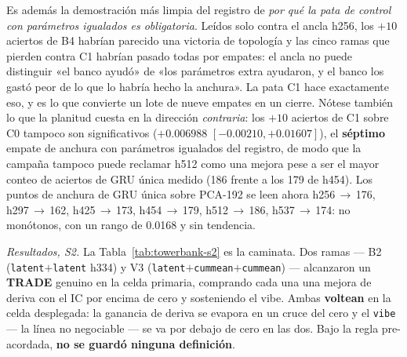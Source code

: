 \documentclass[11pt]{article}
\begin{document}
Es además la demostración más limpia del registro de \emph{por qué la pata de
control con parámetros igualados es obligatoria}. Leídos solo contra el ancla
h256, los $+\num{10}$ aciertos de B4 habrían parecido una victoria de topología y
las cinco ramas que pierden contra C1 habrían pasado todas por empates: el ancla
no puede distinguir «el banco ayudó» de «los parámetros extra ayudaron, y el banco
los gastó peor de lo que lo habría hecho la anchura». La pata C1 hace exactamente
eso, y es lo que convierte un lote de nueve empates en un cierre. Nótese también
lo que la planitud cuesta en la dirección \emph{contraria}: los $+\num{10}$
aciertos de C1 sobre C0 tampoco son significativos ($+\num{0.006988}$
$[-\num{0.00210},+\num{0.01607}]$), el \textbf{séptimo} empate de anchura con
parámetros igualados del registro, de modo que la campaña tampoco puede reclamar
h512 como una mejora pese a ser el mayor conteo de aciertos de GRU única medido
(\num{186} frente a los \num{179} de h454). Los puntos de anchura de GRU única
sobre PCA-192 se leen ahora h256\,$\to$\,\num{176}, h297\,$\to$\,\num{162},
h425\,$\to$\,\num{173}, h454\,$\to$\,\num{179}, h512\,$\to$\,\num{186},
h537\,$\to$\,\num{174}: no monótonos, con un rango de \num{0.0168} y sin
tendencia.

\emph{Resultados, S2.} La Tabla~\ref{tab:towerbank-s2} es la caminata. Dos ramas
--- B2 (\texttt{latent}$+$\texttt{latent} h334) y V3
(\texttt{latent}$+$\texttt{cummean}$+$\texttt{cummean}) --- alcanzaron un
\textbf{TRADE} genuino en la celda primaria, comprando cada una una mejora de
deriva con el IC por encima de cero y sosteniendo el vibe. Ambas
\textbf{voltean} en la celda desplegada: la ganancia de deriva se evapora en un
cruce del cero y el \texttt{vibe} --- la línea no negociable --- se va por debajo
de cero en las dos. Bajo la regla pre-acordada, \textbf{no se guardó ninguna
definición}.
\end{document}
